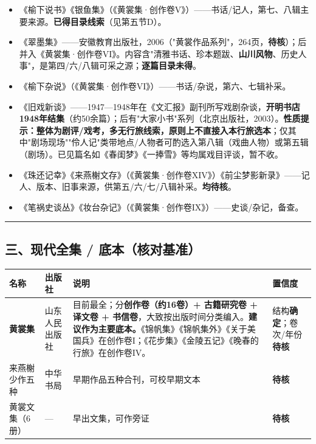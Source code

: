 \documentclass[UTF8,fontset=none,zihao=-4,a4paper]{ctexart}
\begin{document}
\begin{itemize}
\item 《榆下说书》《银鱼集》（《黄裳集·创作卷V》）——书话/记人，第七、八辑主要来源。\textbf{已得目录线索}（见第五节D）。
\item 《翠墨集》——安徽教育出版社，2006（"黄裳作品系列"，264页，\textbf{待核}）；后并入《黄裳集·创作卷VI》。内容含"清雅书话、珍本题跋、\textbf{山川风物}、历史人事"，是第四/六/八辑可采之源；\textbf{逐篇目录未得}。
\item 《榆下杂说》（《黄裳集·创作卷VI》）——书话/杂说，第六、七辑补采。
\item 《旧戏新谈》——1947—1948年在《文汇报》副刊所写戏剧杂谈，\textbf{开明书店1948年结集}（约50余篇）；后有"大家小书"系列（北京出版社，2003）。\textbf{性质提示：整体为剧评/戏考，多无行旅线索，原则上不直接入本行旅选本}；仅其中"剧场现场""伶人记"类带地点/人物者可酌选入第八辑（戏曲人物）或第五辑（剧场）。已见篇名如《春闺梦》《一捧雪》等均属戏目评谈，暂不收。
\item 《珠还记幸》《来燕榭文存》（《黄裳集·创作卷XIV》）《前尘梦影新录》——记人、版本、旧事来源，供第五/六/七/八辑补采。\textbf{均待核}。
\item 《笔祸史谈丛》《妆台杂记》（《黄裳集·创作卷IX》）——史谈/杂记，备查。
\end{itemize}


\medskip\hrule\medskip

\subsection{三、现代全集 / 底本（核对基准）}


\begin{center}
\scriptsize
\begin{tabularx}{\linewidth}{@{}XXXX@{}}
\toprule
\textbf{名称} & \textbf{出版社} & \textbf{说明} & \textbf{置信度} \\
\midrule
\textbf{黄裳集} & 山东人民出版社 & 目前最全；分\textbf{创作卷（约16卷）+ 古籍研究卷 + 译文卷 + 书信卷}，大致按出版时间分类编入。\textbf{建议作为主要底本。}《锦帆集》《锦帆集外》《关于美国兵》在创作卷I；《花步集》《金陵五记》《晚春的行旅》在创作卷IV。 & 结构\textbf{确定}；卷次/年份\textbf{待核} \\
来燕榭少作五种 & 中华书局 & 早期作品五种合刊，可校早期文本 & \textbf{待核} \\
黄裳文集（6册） & — & 早出文集，可作旁证 & \textbf{待核} \\
\bottomrule
\end{tabularx}
\end{center}
\end{document}
